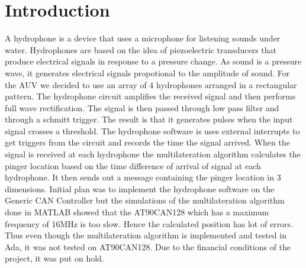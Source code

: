 \section{Introduction}\label{sec:introduction}
A hydrophone is a device that uses a microphone for listening sounds under water. Hydrophones are based on the idea of piezoelectric transducers that produce electrical signals in response to a pressure change. As sound is a pressure wave, it generates electrical signals propotional to the amplitude of sound.
For the AUV we decided to use an array of 4 hydrophones arranged in a rectangular pattern. 
The hydrophone circuit amplifies the received signal and then performs full wave rectification. The signal is then passed through low pass filter and through a schmitt trigger. The result is that it generates pulses when the input signal crosses a threshold. \newline
The hydrophone software is uses external interrupts to get triggers from the circuit and records the time the signal arrived. When the signal is received at each hydrophone the multilateration algorithm calculates the pinger location based on the time difference of arrival of signal at each hydrophone. It then sends out a message containing the pinger location in 3 dimensions.\newline
Initial plan was to implement the hydrophone software on the Generic CAN Controller but the simulations of the multilateration algorithm done in MATLAB showed that the AT90CAN128 which has a maximum frequency of 16MHz is too slow. Hence the calculated position has lot of errors. Thus even though the multilateration algorithm is implemented and tested in Ada, it was not tested on AT90CAN128. Due to the financial conditions of the project, it was put on hold.
  

